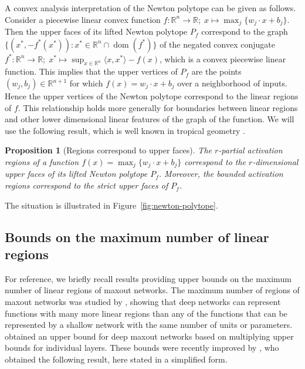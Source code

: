 \documentclass{article}
\newtheorem{proposition}[theorem]{Proposition}
\theoremstyle{definition}
\begin{document}
A convex analysis interpretation of the Newton polytope can be given as follows. Consider a piecewise linear convex function $f\colon \mathbb{R}^n\to\mathbb{R};\; x\mapsto \max_j\{w_j\cdot x + b_j\}$. Then the upper faces of its lifted Newton polytope $P_f$ correspond to the graph $\{(x^\ast, -f^\ast(x^\ast))\colon x^\ast\in \mathbb{R}^n\cap \operatorname{dom}(f^\ast)\}$ of the negated convex conjugate $f^\ast\colon \mathbb{R}^n\to\mathbb{R};\; x^\ast\mapsto \sup_{x\in\mathbb{R}^n} \langle x,x^\ast\rangle -f(x)$, which is a convex piecewise linear function.
This implies that the upper vertices of $P_f$ are the points $(w_j,b_j)\in\mathbb{R}^{n+1}$ for which $f(x) = w_j\cdot x +b_j$ over a neighborhood of inputs. Hence the upper vertices of the Newton polytope correspond to the linear regions of $f$. 
This relationship holds more generally for boundaries between linear regions and other lower dimensional linear features of the graph of the function. 
We will use the following result, which is well known in tropical geometry \cite[see][]{JoswigBook}. 

\begin{proposition}[Regions correspond to upper faces] 
\label{prop:Newton}
The $r$-partial activation regions of a function $f(x) = \max_j\{w_j\cdot x+b_j\}$ correspond to the $r$-dimensional upper faces of its lifted Newton polytope $P_f$. Moreover, the bounded activation regions correspond to the strict upper faces of $P_{f}$.
\end{proposition}

The situation is illustrated in Figure~\ref{fig:newton-polytope}. 

\subsection{Bounds on the maximum number of linear regions}
\label{sec:upperbound} 

For reference, we briefly recall results providing upper bounds on the maximum number of linear regions of maxout networks. 
The maximum number of regions of maxout networks was studied by \cite{pascanu2013number, NIPS2014_5422}, showing that deep networks can represent functions with many more linear regions than any of the functions that can be represented by a shallow network with the same number of units or parameters.
\citet{serra2018bounding} obtained an upper bound for deep maxout networks based on multiplying upper bounds for individual layers.
These bounds were recently improved by \citet{sharp2021}, who obtained the following result, here stated in a simplified form. 
\end{document}
